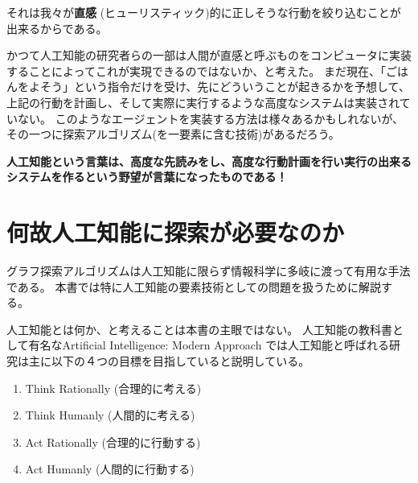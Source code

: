 \documentclass[10pt]{book}
\newcommand{\TODO}{{\bf TODO}}
\begin{document}
それは我々が{\bf 直感} (ヒューリスティック)的に正しそうな行動を絞り込むことが出来るからである。

かつて人工知能の研究者らの一部は人間が直感と呼ぶものをコンピュータに実装することによってこれが実現できるのではないか、と考えた。
まだ現在、「ごはんをよそう」という指令だけを受け、先にどういうことが起きるかを予想して、上記の行動を計画し、そして実際に実行するような高度なシステムは実装されていない。
このようなエージェントを実装する方法は様々あるかもしれないが、その一つに探索アルゴリズム(を一要素に含む技術)があるだろう。

{\bf 人工知能という言葉は、高度な先読みをし、高度な行動計画を行い実行の出来るシステムを作るという野望が言葉になったものである！}





\section{何故人工知能に探索が必要なのか}
\label{sec:why-search}

グラフ探索アルゴリズムは人工知能に限らず情報科学に多岐に渡って有用な手法である。
本書では特に人工知能の要素技術としての問題を扱うために解説する。

人工知能とは何か、と考えることは本書の主眼ではない。
人工知能の教科書として有名なArtificial Intelligence: Modern Approach \cite{russelln03}では人工知能と呼ばれる研究は主に以下の４つの目標を目指していると説明している。

\begin{enumerate}
\item Think Rationally (合理的に考える)
\item Think Humanly (人間的に考える)
\item Act Rationally (合理的に行動する)
\item Act Humanly (人間的に行動する)
\end{enumerate}
\end{document}

